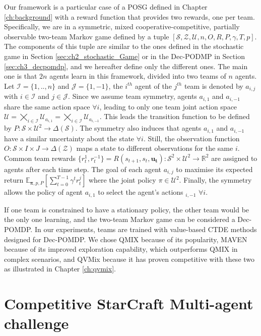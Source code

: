 Our framework is a particular case of a POSG defined in Chapter \ref{ch:background} with a reward function that provides two rewards, one per team.
Specifically, we are in a symmetric, mixed cooperative-competitive, partially observable two-team Markov game defined by a tuple $[\mathcal{S}, \mathcal{Z}, \mathcal{U}, n, O, R, P, \gamma, T, p]$.
The components of this tuple are similar to the ones defined in the stochastic game in Section \ref{sec:ch2_stochastic_Game} or in the Dec-PODMP in Section \ref{sec:ch3_decpomdp}, and we hereafter define only the different ones.
The main one is that $2n$ agents learn in this framework, divided into two teams of $n$ agents.
Let $\mathcal{I}=\{1,..,n\}$ and $\mathcal{J}=\{1,-1\}$, the $i^{th}$ agent of the $j^{th}$ team is denoted by $a_{i, j}$ with $i \in \mathcal{I}$ and $ j \in \mathcal{J}$.
Since we assume team symmetry, agents $a_{i, 1}$ and $a_{i, -1}$ share the same action space $\forall i$, leading to only one team joint action space $\mathcal{U}=\bigtimes_{i\in \mathcal{I}} \mathcal{U}_{{a_{i, 1}}} = \bigtimes_{i\in \mathcal{I}} 
\mathcal{U}_{{a_{i, -1}}}$.
This leads the transition function to be defined by $P: \mathcal{S} \times \mathcal{U}^2 \rightarrow \Delta(\mathcal{S})$.
The symmetry also induces that agents $a_{i, 1}$ and $a_{i, -1}$ have a similar uncertainty about the state $\forall i$.
Still, the observation function $O: \mathcal{S} \times I \times J \rightarrow \Delta(\mathcal{Z})$ maps a state to different observations for the same $i$.
Common team rewards $\{r_t^1, r_t^{-1}\} = R(s_{t+1}, s_t, \mathbf{u_t}): \mathcal{S}^2 \times \mathcal{U}^2 \rightarrow \mathbb{R}^2$ are assigned to agents after each time step.
The goal of each agent $a_{i, j}$ to maximise its expected return $\mathbb{E}_{\mathbf{\pi}, p, P}\left[ \sum_{t=0}^{T-1} \gamma^t r^{j}_t \right]$ where the joint policy $\pi \in \mathcal{U}^2$.
Finally, the symmetry allows the policy of agent $a_{i, 1}$ to select the agent's actions $_{i, -1}$ $\forall i$.

If one team is constrained to have a stationary policy, the other team would be the only one learning, and the two-team Markov game can be considered a Dec-POMDP.
In our experiments, teams are trained with value-based CTDE methods designed for Dec-POMDP.
We chose QMIX because of its popularity, MAVEN because of its improved exploration capability, which outperforms QMIX in complex scenarios, and QVMix because it has proven competitive with these two as illustrated in Chapter \ref{ch:qvmix}.

\section{Competitive StarCraft Multi-agent challenge} \label{sec:ch7_competsmac}

